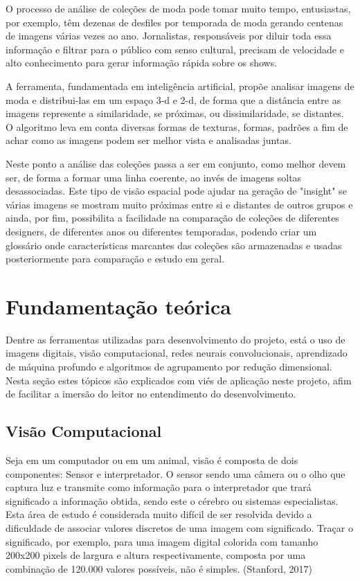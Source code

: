 \documentclass[12pt]{report}
\begin{document}
O processo de análise de coleções de moda pode tomar muito tempo, entusiastas, por exemplo, têm dezenas de desfiles por temporada de moda gerando centenas de imagens várias vezes ao ano. Jornalistas, responsáveis por diluir toda essa informação e filtrar para o público com senso cultural, precisam de velocidade e alto conhecimento para gerar informação rápida sobre os shows. 

A ferramenta, fundamentada em inteligência artificial, propõe analisar imagens de moda e distribui-las em um espaço 3-d e 2-d, de forma que a distância entre as imagens represente a similaridade, se próximas, ou dissimilaridade, se distantes. O algoritmo leva em conta diversas formas de texturas, formas, padrões a fim de achar como as imagens podem ser melhor vista e analisadas juntas. 

Neste ponto a análise das coleções passa a ser em conjunto, como melhor devem ser, de forma a formar uma linha coerente, ao invés de imagens soltas desassociadas. Este tipo de visão espacial pode ajudar na geração de "insight" se várias imagens se mostram muito próximas entre si e distantes de outros grupos e ainda, por fim, possibilita a facilidade na comparação de coleções de diferentes designers, de diferentes anos ou diferentes temporadas, podendo criar um glossário onde características marcantes das coleções são armazenadas e usadas posteriormente para comparação e estudo em geral.

\chapter{Fundamentação teórica}
\label{cha:fund-teor}

Dentre as ferramentas utilizadas para desenvolvimento do projeto, está o uso de imagens digitais, visão computacional, redes neurais convolucionais, aprendizado de máquina profundo e algoritmos de agrupamento por redução dimensional. Nesta seção estes tópicos são explicados com viés de aplicação neste projeto, afim de facilitar a imersão do leitor no entendimento do desenvolvimento.

\section{Visão Computacional}

Seja em um computador ou em um animal, visão é composta de dois componentes: Sensor e interpretador. O sensor sendo uma câmera ou o olho que captura luz e transmite como informação para o interpretador que trará significado a informação obtida, sendo este o cérebro ou sistemas especialistas. Esta área de estudo é considerada muito difícil de ser resolvida devido a dificuldade de associar valores discretos de uma imagem com significado. Traçar o significado, por exemplo, para uma imagem digital colorida com tamanho 200x200 pixels de largura e altura respectivamente, composta por uma combinação de 120.000 valores possíveis, não é simples. (Stanford, 2017)
\end{document}

